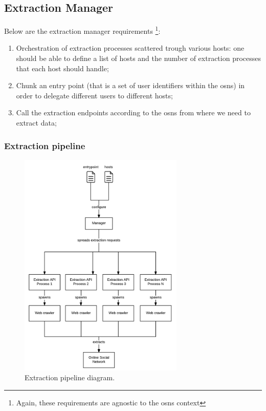 \subsection{Extraction Manager}

Below are the extraction manager requirements \footnote{Again, these requirements are agnostic to the \glspl{osn} context}:

\begin{enumerate}
    \item Orchestration of extraction processes scattered trough various hosts: one should be able to define a list of hosts and the number of extraction processes that each host should handle;
    \item Chunk an entry point (that is a set of user identifiers within the \glspl{osn}) in order to delegate different users to different hosts;
    \item Call the extraction endpoints according to the \glspl{osn} from where we need to extract data;
\end{enumerate}

\subsubsection{Extraction pipeline}

\begin{figure}[h!]
\begin{center}
  \includegraphics[width=0.7\textwidth]{img/ext-pipeline.png}
\end{center}
\caption{\label{img:extpipeline} Extraction pipeline diagram.}
\end{figure}

